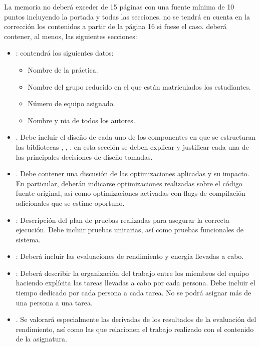 La memoria no deberá exceder de 15 páginas con una fuente mínima de 10 puntos
incluyendo la portada y todas las secciones.  no se tendrá en cuenta en la
corrección los contenidos a partir de la página 16 si fuese el caso.  deberá
contener, al menos, las siguientes secciones: 

\begin{itemize}

\item {}: contendrá los siguientes datos:
  \begin{itemize}
    \item Nombre de la práctica.
    \item Nombre del grupo reducido en el que están matriculados los estudiantes.
    \item Número de equipo asignado.
    \item Nombre y nia de todos los autores.
  \end{itemize}

\item {}. 
      Debe incluir el diseño de cada uno de los componentes
      en que se estructuran las bibliotecas , , .
      en esta sección se deben explicar y justificar cada una de las principales 
      decisiones de diseño tomadas.

\item {}.
      Debe contener una discusión de las optimizaciones
      aplicadas y su impacto. En particular, deberán indicarse optimizaciones
      realizadas sobre el código fuente original, así como optimizaciones
      activadas con flags de compilación adicionales que se estime oportuno.

\item {}: 
      Descripción del plan de pruebas realizadas para asegurar la correcta ejecución.
      Debe incluir pruebas unitarias, así como pruebas funcionales de sistema.

\item {}: 
      Deberá incluir las evaluaciones de rendimiento y energía llevadas a cabo.

\item {}:
      Deberá describir la organización del trabajo entre los miembros del equipo
      haciendo explícita las tareas llevadas a cabo por cada persona.
      Debe incluir el tiempo dedicado por cada persona a cada tarea.
      No se podrá asignar más de una persona a una tarea.

\item {}.
      Se valorará especialmente las derivadas de los resultados de la evaluación
      del rendimiento, así como las que relacionen el trabajo realizado con el contenido
      de la asignatura.

\end{itemize}



